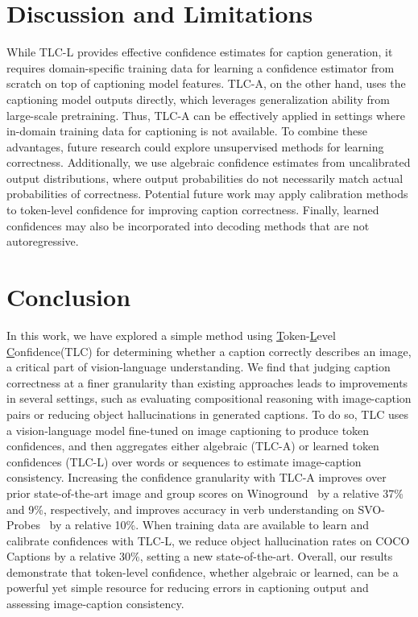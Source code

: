 \documentclass[10pt,twocolumn,letterpaper]{article}
\newcommand{\ApproachName}{TLC\xspace}
\newcommand{\ApproachNameLong}{\underline{T}oken-\underline{L}evel \underline{C}onfidence\xspace}
\begin{document}
\section{Discussion and Limitations}
\label{sec:limitations}

While \ApproachName-L provides effective confidence estimates for caption generation, it requires domain-specific training data for learning a confidence estimator from scratch on top of captioning model features. \ApproachName-A, on the other hand, uses the captioning model outputs directly, which leverages generalization ability from large-scale pretraining. Thus, \ApproachName-A can be effectively applied in settings where in-domain training data for captioning is not available. To combine these advantages, future research could explore unsupervised methods for learning correctness. Additionally, we use algebraic confidence estimates from uncalibrated output distributions, where output probabilities do not necessarily match actual probabilities of correctness. Potential future work may apply calibration methods to token-level confidence for improving caption correctness. Finally, learned confidences may also be incorporated into decoding methods that are not autoregressive.


\section{Conclusion}
\label{sec:conclusion}

In this work, we have explored a simple method using \ApproachNameLong (\ApproachName) for determining whether a caption correctly describes an image, a critical part of vision-language understanding. 
We find that judging caption correctness at a finer granularity than existing approaches leads to improvements in several settings, such as evaluating compositional reasoning with image-caption pairs or reducing object hallucinations in generated captions. To do so, \ApproachName uses a vision-language model fine-tuned on image captioning to produce token confidences, and then aggregates either algebraic (\ApproachName-A) or learned token confidences (\ApproachName-L) over words or sequences to estimate image-caption consistency. Increasing the confidence granularity with \ApproachName-A improves over prior state-of-the-art image and group scores on Winoground~\cite{thrush_and_ross2022winoground} by a relative 37\% and 9\%, respectively, and improves accuracy in verb understanding on SVO-Probes~\cite{hendricks2021probing} by a relative 10\%. When training data are available to learn and calibrate confidences with \ApproachName-L, we reduce object hallucination rates on COCO Captions by a relative 30\%, setting a new state-of-the-art. Overall, our results demonstrate that token-level confidence, whether algebraic or learned, can be a powerful yet simple resource for reducing errors in captioning output and assessing image-caption consistency.
\end{document}
